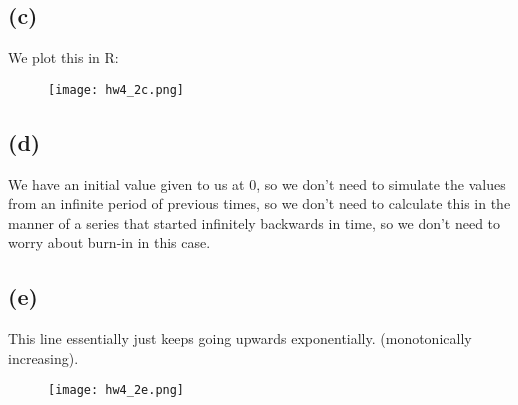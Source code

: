 \documentclass{article}
\begin{document}
{\subsection*{(c)}

We plot this in R: 
\begin{figure}[h!]
  \centering
  \texttt{[image: hw4\_2c.png]}
\end{figure}

\subsection*{(d)}

We have an initial value given to us at 0, so we don't need to simulate the values from an infinite period of previous times, so we don't need to calculate this in the manner of a series that started infinitely backwards in time, so we don't need to worry about burn-in in this case.

\newpage

\subsection*{(e)}

This line essentially just keeps going upwards exponentially. (monotonically increasing).
\begin{figure}[h]
  \centering
  \texttt{[image: hw4\_2e.png]}
\end{figure}

}
\end{document}
